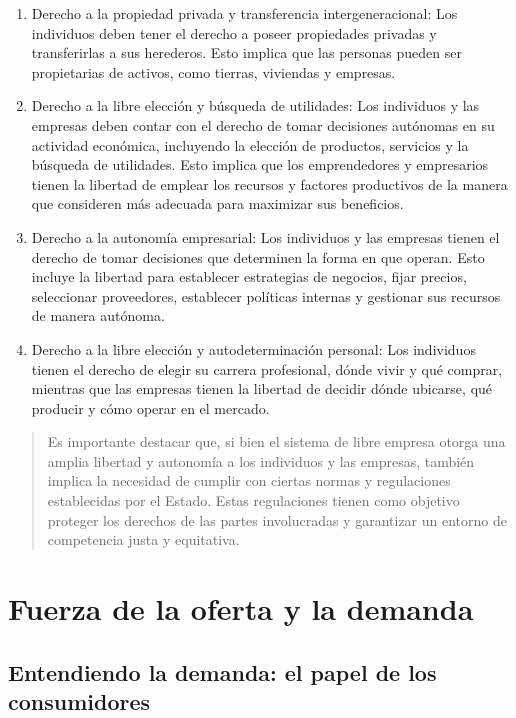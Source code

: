 \documentclass[
  man,
  floatsintext,
  longtable,
  a4paper,
  nolmodern,
  notxfonts,
  notimes,
  12pt,
  colorlinks=true,linkcolor=blue,citecolor=blue,urlcolor=blue]{apa7}
\begin{document}
\begin{enumerate}
\def\labelenumi{\arabic{enumi}.}
\item
  Derecho a la propiedad privada y transferencia intergeneracional: Los
  individuos deben tener el derecho a poseer propiedades privadas y
  transferirlas a sus herederos. Esto implica que las personas pueden
  ser propietarias de activos, como tierras, viviendas y empresas.
\item
  Derecho a la libre elección y búsqueda de utilidades: Los individuos y
  las empresas deben contar con el derecho de tomar decisiones autónomas
  en su actividad económica, incluyendo la elección de productos,
  servicios y la búsqueda de utilidades. Esto implica que los
  emprendedores y empresarios tienen la libertad de emplear los recursos
  y factores productivos de la manera que consideren más adecuada para
  maximizar sus beneficios.
\item
  Derecho a la autonomía empresarial: Los individuos y las empresas
  tienen el derecho de tomar decisiones que determinen la forma en que
  operan. Esto incluye la libertad para establecer estrategias de
  negocios, fijar precios, seleccionar proveedores, establecer políticas
  internas y gestionar sus recursos de manera autónoma.
\item
  Derecho a la libre elección y autodeterminación personal: Los
  individuos tienen el derecho de elegir su carrera profesional, dónde
  vivir y qué comprar, mientras que las empresas tienen la libertad de
  decidir dónde ubicarse, qué producir y cómo operar en el mercado.
\end{enumerate}

\begin{quote}
Es importante destacar que, si bien el sistema de libre empresa otorga
una amplia libertad y autonomía a los individuos y las empresas, también
implica la necesidad de cumplir con ciertas normas y regulaciones
establecidas por el Estado. Estas regulaciones tienen como objetivo
proteger los derechos de las partes involucradas y garantizar un entorno
de competencia justa y equitativa.
\end{quote}

\section{Fuerza de la oferta y la
demanda}\label{fuerza-de-la-oferta-y-la-demanda}

\subsection{Entendiendo la demanda: el papel de los
consumidores}\label{entendiendo-la-demanda-el-papel-de-los-consumidores}
\end{document}
